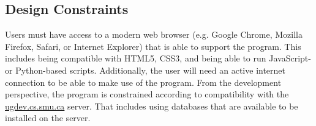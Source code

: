 \documentclass[11pt]{article}
\begin{document}
\subsection{Design Constraints}
Users must have access to a modern web browser (e.g. Google Chrome, Mozilla Firefox, Safari, or
Internet Explorer) that is able to support the program. This includes being compatible with HTML5,
CSS3, and being able to run JavaScript- or Python-based scripts. Additionally, the user will need an
active internet connection to be able to make use of the program. From the development perspective,
the program is constrained according to compatibility with the \url{ugdev.cs.smu.ca} server. That
includes using databases that are available to be installed on the server.
\end{document}
